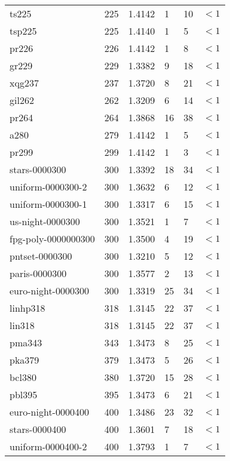\begin{longtable}{|lrrlll|}
ts225 & 225 & \num{1.4142} & \num{1} & \num{10} & $<1$ \\
tsp225 & 225 & \num{1.4140} & \num{1} & \num{5} & $<1$ \\
pr226 & 226 & \num{1.4142} & \num{1} & \num{8} & $<1$ \\
gr229 & 229 & \num{1.3382} & \num{9} & \num{18} & $<1$ \\
xqg237 & 237 & \num{1.3720} & \num{8} & \num{21} & $<1$ \\
gil262 & 262 & \num{1.3209} & \num{6} & \num{14} & $<1$ \\
pr264 & 264 & \num{1.3868} & \num{16} & \num{38} & $<1$ \\
a280 & 279 & \num{1.4142} & \num{1} & \num{5} & $<1$ \\
pr299 & 299 & \num{1.4142} & \num{1} & \num{3} & $<1$ \\
stars-0000300 & 300 & \num{1.3392} & \num{18} & \num{34} & $<1$ \\
uniform-0000300-2 & 300 & \num{1.3632} & \num{6} & \num{12} & $<1$ \\
uniform-0000300-1 & 300 & \num{1.3317} & \num{6} & \num{15} & $<1$ \\
us-night-0000300 & 300 & \num{1.3521} & \num{1} & \num{7} & $<1$ \\
fpg-poly-0000000300 & 300 & \num{1.3500} & \num{4} & \num{19} & $<1$ \\
pntset-0000300 & 300 & \num{1.3210} & \num{5} & \num{12} & $<1$ \\
paris-0000300 & 300 & \num{1.3577} & \num{2} & \num{13} & $<1$ \\
euro-night-0000300 & 300 & \num{1.3319} & \num{25} & \num{34} & $<1$ \\
linhp318 & 318 & \num{1.3145} & \num{22} & \num{37} & $<1$ \\
lin318 & 318 & \num{1.3145} & \num{22} & \num{37} & $<1$ \\
pma343 & 343 & \num{1.3473} & \num{8} & \num{25} & $<1$ \\
pka379 & 379 & \num{1.3473} & \num{5} & \num{26} & $<1$ \\
bcl380 & 380 & \num{1.3720} & \num{15} & \num{28} & $<1$ \\
pbl395 & 395 & \num{1.3473} & \num{6} & \num{21} & $<1$ \\
euro-night-0000400 & 400 & \num{1.3486} & \num{23} & \num{32} & $<1$ \\
stars-0000400 & 400 & \num{1.3601} & \num{7} & \num{18} & $<1$ \\
uniform-0000400-2 & 400 & \num{1.3793} & \num{1} & \num{7} & $<1$ \\

\end{longtable}
